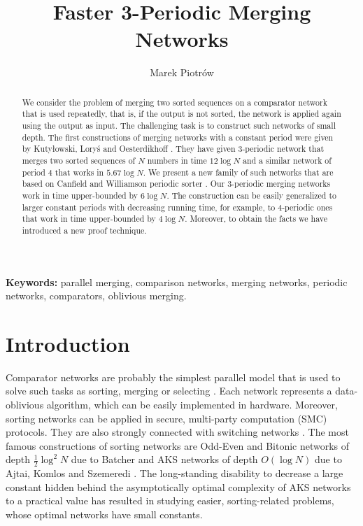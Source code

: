 \documentclass{llncs}
\title{Faster 3-Periodic Merging Networks}
\author{Marek Piotr\'ow}
\institute{Institute of Computer Science, University of Wroc\l aw,\\ 
ul.~Joliot-Curie~15, PL-50-383 Wroc\l aw, Poland\\
\email{Marek.Piotrow@ii.uni.wroc.pl}}
\begin{document}
\maketitle

\begin{abstract} We consider the problem of merging two sorted sequences on a comparator
network that is used repeatedly, that is, if the output is not sorted,
the network is applied again using the output as input. The challenging
task is to construct such networks of small depth. The first
constructions of merging networks with a constant period were given by
Kuty{\l}owski, Lory{\'s} and Oesterdikhoff \cite{klo}. They have given
$3$-periodic network that merges two sorted sequences of $N$ numbers in
time $12\log N$ and a similar network of period $4$ that works in
$5.67\log N$.  We present a new family of such networks that are based
on Canfield and Williamson periodic sorter \cite{cw}. Our $3$-periodic
merging networks work in time upper-bounded by $6\log N$. The construction
can be easily generalized to larger constant periods with decreasing
running time, for example, to $4$-periodic ones that work in time 
upper-bounded by $4\log N$. Moreover, to obtain the facts we have introduced 
a new proof technique.
\end{abstract}

\medskip
\noindent\textbf{Keywords:} parallel merging, comparison networks, 
merging networks, periodic networks, comparators, oblivious merging.





\section{Introduction}  \label{intro}

Comparator networks are probably the simplest parallel model that is used to
solve such tasks as sorting, merging or selecting \cite{k}. Each network
represents a data-oblivious algorithm, which can be easily implemented in
hardware. Moreover, sorting networks can be applied in secure, multi-party
computation (SMC) protocols. They are also strongly connected with switching
networks \cite{l}. The most famous constructions of sorting networks are
Odd-Even and Bitonic networks of depth $\frac{1}{2}\log^2 N$ due to Batcher
\cite{b} and AKS networks of depth $O(\log N)$ due to Ajtai, Komlos and
Szemeredi \cite{aks}. The long-standing disability to decrease a large
constant hidden behind the asymptotically optimal complexity of AKS networks
to a practical value \cite{s} has resulted in studying easier, sorting-related
problems, whose optimal networks have small constants.
\end{document}

